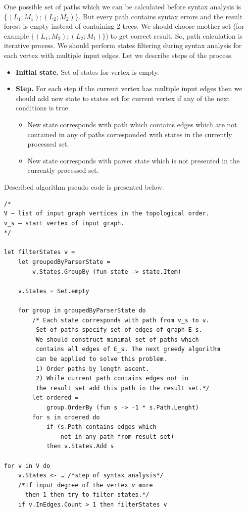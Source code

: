 \documentclass{llncs}
\begin{document}
One possible set of paths which we can be calculated before syntax analysis is $\{(L_1; M_1); (L_2; M_2)\}$. But every path contains syntax errors and the result forest is empty instead of containing 2 trees. We should choose another set (for example $\{(L_1; M_2); (L_2; M_1)\}$) to get correct result. So, path calculation is iterative process. We should perform states filtering during syntax analysis for each vertex with multiple input edges. Let we describe steps of the process.

\begin{itemize}
    \item \textbf{Initial state.} Set of states for vertex is empty. 
    \item \textbf{Step.} For each step if the current vertex has multiple input edges then we should add new state to states set for current vertex if any of the next conditions is true.
    \begin{itemize}
        \item New state corresponds with path which contains edges which are not contained in any of paths corresponded with states in the currently processed set. 
        \item New state corresponds with parser state which is not presented in the currently processed set.
    \end{itemize}

\end{itemize}

Described algorithm pseudo code is presented below.
\begin{verbatim}
/*
V – list of input graph vertices in the topological order.
v_s – start vertex of input graph.
*/

let filterStates v =
    let groupedByParserState =
        v.States.GroupBy (fun state -> state.Item)

    v.States = Set.empty

    for group in groupedByParserState do
        /* Each state corresponds with path from v_s to v.
         Set of paths specify set of edges of graph E_s.
         We should construct minimal set of paths which
         contains all edges of E_s. The next greedy algorithm
         can be applied to solve this problem.
         1) Order paths by length ascent.
         2) While current path contains edges not in
         the result set add this path in the result set.*/
        let ordered = 
            group.OrderBy (fun s -> -1 * s.Path.Lenght)
        for s in ordered do
            if (s.Path contains edges which 
                not in any path from result set) 
            then v.States.Add s

for v in V do
    v.States <- … /*step of syntax analysis*/
    /*If input degree of the vertex v more 
      then 1 then try to filter states.*/
    if v.InEdges.Count > 1 then filterStates v

\end{verbatim}
\end{document}
